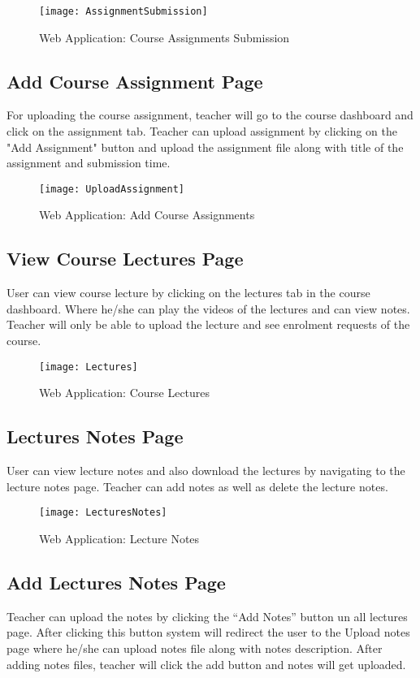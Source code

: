 \begin{figure}[h]
  \centering
  \texttt{[image: AssignmentSubmission]}
  \caption{Web Application: Course Assignments Submission}
\end{figure}

\subsection{Add Course Assignment Page}
For uploading the course assignment, teacher will go to the course dashboard and click on the assignment tab. Teacher can upload assignment by clicking on the "Add Assignment" button and upload the assignment file along with title of the assignment and submission time.

\begin{figure}[h]
  \centering
  \texttt{[image: UploadAssignment]}
  \caption{Web Application: Add Course Assignments}
\end{figure}

\subsection{View Course Lectures Page}
User can view course lecture by clicking on the lectures tab in the course dashboard. Where he/she can play the videos of the lectures and can view notes. Teacher will only be able to upload the lecture and see enrolment requests of the course.

\begin{figure}[h]
  \centering
  \texttt{[image: Lectures]}
  \caption{Web Application: Course Lectures}
\end{figure}

\subsection{Lectures Notes Page}
User can view lecture notes and also download the lectures by navigating to the lecture notes page. Teacher can add notes as well as delete the lecture notes.

\begin{figure}[h]
  \centering
  \texttt{[image: LecturesNotes]}
  \caption{Web Application: Lecture Notes}
\end{figure}

\subsection{Add Lectures Notes Page}
Teacher can upload the notes by clicking the “Add Notes” button un all lectures page.  After clicking this button system will redirect the user to the Upload notes page where he/she can upload notes file along with notes description. After adding notes files,  teacher  will click the add button and notes will get uploaded.

